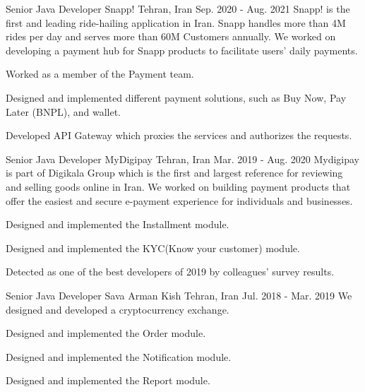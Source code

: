 \begin{cventries}
  \cventry
    {Senior Java Developer} %
    {Snapp!} %
    {Tehran, Iran} %
    {Sep. 2020 - Aug. 2021} %
    {
      Snapp! is the first and leading ride-hailing application in Iran. Snapp handles more than 4M rides per day and serves more than 60M Customers annually.
      We worked on developing a payment hub for Snapp products to facilitate users' daily payments.
    }
    {
      \begin{cvitems} %
        \item {Worked as a member of the Payment team.}
        \item {Designed and implemented different payment solutions, such as Buy Now, Pay Later (BNPL), and wallet.}
        \item {Developed API Gateway which proxies the services and authorizes the requests.}
      \end{cvitems}
    }

  \cventry
    {Senior Java Developer} %
    {MyDigipay} %
    {Tehran, Iran} %
    {Mar. 2019 - Aug. 2020} %
    {
      Mydigipay is part of Digikala Group which is the first and largest reference for reviewing and selling goods online in Iran.
      We worked on building payment products that offer the easiest and secure e-payment experience for individuals and businesses.
    }
    {
      \begin{cvitems} %
        \item {Designed and implemented the Installment module.}
        \item {Designed and implemented the KYC(Know your customer) module.}
        \item {Detected as one of the best developers of 2019 by colleagues' survey results.}
      \end{cvitems}
    }

  \cventry
    {Senior Java Developer} %
    {Sava Arman Kish} %
    {Tehran, Iran} %
    {Jul. 2018 - Mar. 2019} %
    {
      We designed and developed a cryptocurrency exchange.
    }
    {
      \begin{cvitems} %
        \item {Designed and implemented the Order module.}
        \item {Designed and implemented the Notification module.}
        \item {Designed and implemented the Report module.}
      \end{cvitems}
    }


\end{cventries}
